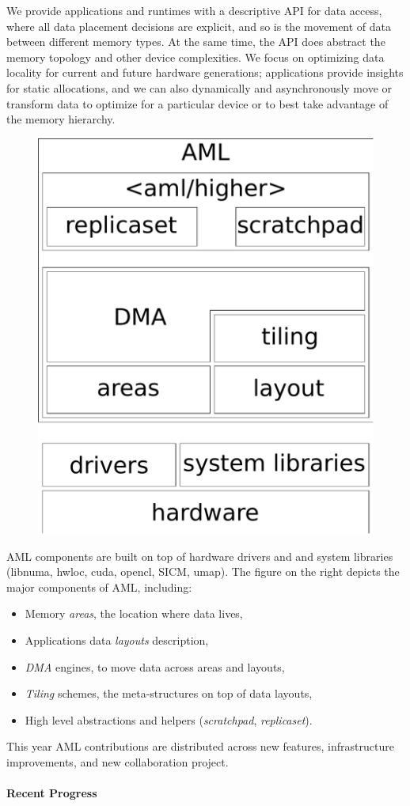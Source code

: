 We provide applications and runtimes with a descriptive API for data
access, where all data placement decisions are explicit, and so is the
movement of data between different memory types.  At the same time, the API
does abstract the memory topology and other device complexities.  We focus
on optimizing data locality for current and future hardware generations;
applications provide insights for static allocations, and we can also
dynamically and asynchronously move or transform data to optimize for a particular 
device or to best take advantage of the memory hierarchy.

\begin{figure}
\includegraphics[width=.18\textwidth]{projects/2.3.1-PMR/2.3.1.19-Argo-PowerSteering/aml-components}
\end{figure}
AML components are built on top of hardware drivers and and system
libraries (libnuma, hwloc, cuda, opencl, SICM, umap).
The figure on the right depicts the major components of AML, including:
\begin{itemize}
\item Memory \emph{areas}, the location where data lives,
\item Applications data \emph{layouts} description,
\item \emph{DMA} engines, to move data across areas and layouts,
\item \emph{Tiling} schemes, the meta-structures on top of data layouts,
\item High level abstractions and helpers (\emph{scratchpad}, \emph{replicaset}).
\end{itemize}

This year AML contributions are distributed across new features,
infrastructure improvements, and new collaboration project.

\paragraph{Recent Progress}

